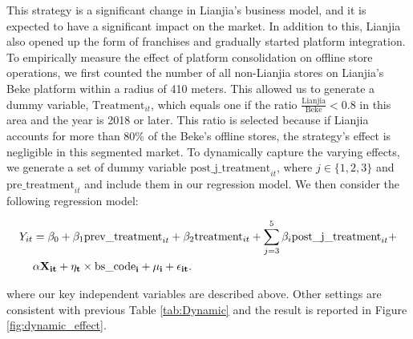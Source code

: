 \documentclass[11pt]{article}
\begin{document}
This strategy is a significant change in Lianjia's business model, and it is expected to have a significant impact on the market. In addition to this, Lianjia also opened up the form of franchises and gradually started platform integration. To empirically measure the effect of platform consolidation on offline store operations, we first counted the number of all non-Lianjia stores on Lianjia's Beke platform within a radius of 410 meters. This allowed us to generate a dummy variable, $\text{Treatment}_{it}$, which equals one if the ratio $\frac{\text{Lianjia}}{\text{Beke}} < 0.8$ in this area and the year is 2018 or later. This ratio is selected because if Lianjia accounts for more than 80\% of the Beke's offline stores, the strategy's effect is negligible in this segmented market. To dynamically capture the varying effects, we generate a set of dummy variable $\text{post\_j\_treatment}_{it}$, where $j \in \{1, 2, 3\}$ and $\text{pre\_treatment}_{it}$ and include them in our regression model. We then consider the following regression model:

\begin{equation}
  \begin{aligned}
    Y_{it} & = \beta_0 + \beta_1 \text{prev\_treatment}_{it} + \beta_2 \text{treatment}_{it} + \sum_{j=3}^5 \beta_{i} \text{post\_j\_treatment}_{it} + \\
           & \bf{\alpha} \bf{X}_{it} + \eta_{t} \times \text{bs\_code}_i + \mu_i + \epsilon_{it}. \label{eq:acn_assessment}
  \end{aligned}
\end{equation}

where our key independent variables are described above. Other settings are consistent with previous Table \ref{tab:Dynamic} and the result is reported in Figure \ref{fig:dynamic_effect}.
\end{document}
